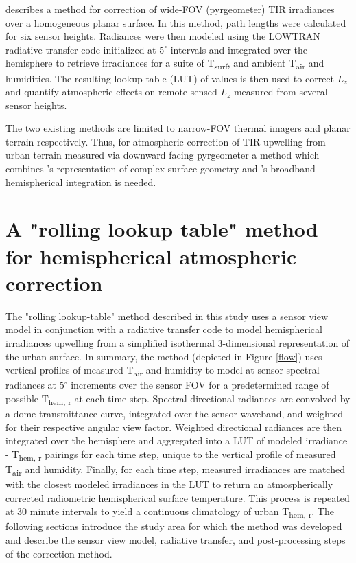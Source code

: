 \begin{bibunit}
\citet{Kotani2009a} describes a method for correction of wide-FOV (pyrgeometer) TIR irradiances over a homogeneous planar surface. In this method, path lengths were calculated for six sensor heights. Radiances were then modeled using the LOWTRAN \citep{Kneizys1988} radiative transfer code initialized at $5^{\circ}$ intervals and integrated over the hemisphere to retrieve irradiances for a suite of T\textsubscript{surf}, and ambient T\textsubscript{air} and humidities. The resulting lookup table (LUT) of values is then used to correct $L_z$ and quantify atmospheric effects on remote sensed $L_z$ measured from several sensor heights. 

The two existing methods are limited to narrow-FOV thermal imagers and planar terrain respectively. Thus, for atmospheric correction of TIR upwelling from urban terrain measured via downward facing pyrgeometer a method which combines \citet{Meier2011}'s representation of complex surface geometry and \citet{Kotani2009a}'s broadband hemispherical integration is needed.

\section{A "rolling lookup table" method for hemispherical atmospheric correction}


The "rolling lookup-table" method described in this study uses a sensor view model in conjunction with a radiative transfer code to model hemispherical irradiances upwelling from a simplified isothermal 3-dimensional representation of the urban surface. In summary, the method (depicted in Figure \ref{flow}) uses vertical profiles of measured T\textsubscript{air} and humidity to model at-sensor spectral radiances at 5$^{\circ}$ increments over the sensor FOV for a predetermined range of possible T\textsubscript{hem, r} at each time-step. Spectral directional radiances are convolved by a dome transmittance curve, integrated over the sensor waveband, and weighted for their respective angular view factor. Weighted directional radiances are then integrated over the hemisphere and aggregated into a LUT of modeled irradiance - T\textsubscript{hem, r} pairings for each time step, unique to the vertical profile of measured T\textsubscript{air} and humidity. Finally, for each time step, measured irradiances are matched with the closest modeled irradiances in the LUT to return an atmospherically corrected radiometric hemispherical surface temperature. This process is repeated at 30 minute intervals to yield a continuous climatology of urban T\textsubscript{hem, r}. The following sections introduce the study area for which the method was developed and describe the sensor view model, radiative transfer, and post-processing steps of the correction method.


\end{bibunit}
